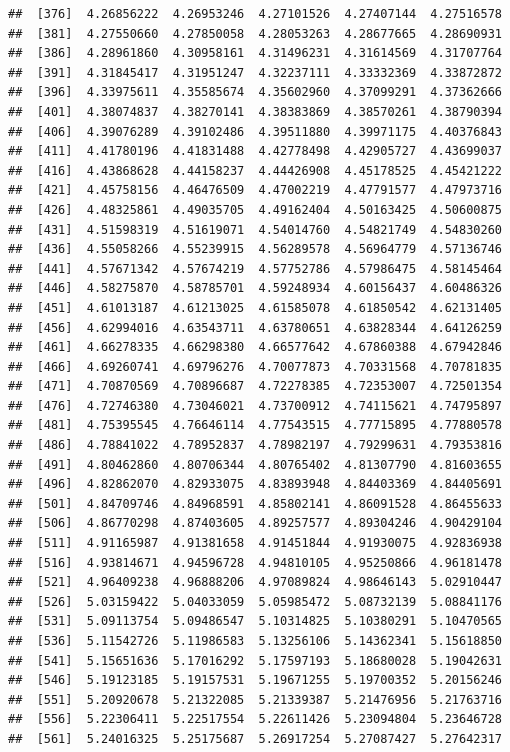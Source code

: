\documentclass[
  11pt]{report}
\begin{document}
\begin{itemize}
\begin{verbatim}
##  [376]  4.26856222  4.26953246  4.27101526  4.27407144  4.27516578
##  [381]  4.27550660  4.27850058  4.28053263  4.28677665  4.28690931
##  [386]  4.28961860  4.30958161  4.31496231  4.31614569  4.31707764
##  [391]  4.31845417  4.31951247  4.32237111  4.33332369  4.33872872
##  [396]  4.33975611  4.35585674  4.35602960  4.37099291  4.37362666
##  [401]  4.38074837  4.38270141  4.38383869  4.38570261  4.38790394
##  [406]  4.39076289  4.39102486  4.39511880  4.39971175  4.40376843
##  [411]  4.41780196  4.41831488  4.42778498  4.42905727  4.43699037
##  [416]  4.43868628  4.44158237  4.44426908  4.45178525  4.45421222
##  [421]  4.45758156  4.46476509  4.47002219  4.47791577  4.47973716
##  [426]  4.48325861  4.49035705  4.49162404  4.50163425  4.50600875
##  [431]  4.51598319  4.51619071  4.54014760  4.54821749  4.54830260
##  [436]  4.55058266  4.55239915  4.56289578  4.56964779  4.57136746
##  [441]  4.57671342  4.57674219  4.57752786  4.57986475  4.58145464
##  [446]  4.58275870  4.58785701  4.59248934  4.60156437  4.60486326
##  [451]  4.61013187  4.61213025  4.61585078  4.61850542  4.62131405
##  [456]  4.62994016  4.63543711  4.63780651  4.63828344  4.64126259
##  [461]  4.66278335  4.66298380  4.66577642  4.67860388  4.67942846
##  [466]  4.69260741  4.69796276  4.70077873  4.70331568  4.70781835
##  [471]  4.70870569  4.70896687  4.72278385  4.72353007  4.72501354
##  [476]  4.72746380  4.73046021  4.73700912  4.74115621  4.74795897
##  [481]  4.75395545  4.76646114  4.77543515  4.77715895  4.77880578
##  [486]  4.78841022  4.78952837  4.78982197  4.79299631  4.79353816
##  [491]  4.80462860  4.80706344  4.80765402  4.81307790  4.81603655
##  [496]  4.82862070  4.82933075  4.83893948  4.84403369  4.84405691
##  [501]  4.84709746  4.84968591  4.85802141  4.86091528  4.86455633
##  [506]  4.86770298  4.87403605  4.89257577  4.89304246  4.90429104
##  [511]  4.91165987  4.91381658  4.91451844  4.91930075  4.92836938
##  [516]  4.93814671  4.94596728  4.94810105  4.95250866  4.96181478
##  [521]  4.96409238  4.96888206  4.97089824  4.98646143  5.02910447
##  [526]  5.03159422  5.04033059  5.05985472  5.08732139  5.08841176
##  [531]  5.09113754  5.09486547  5.10314825  5.10380291  5.10470565
##  [536]  5.11542726  5.11986583  5.13256106  5.14362341  5.15618850
##  [541]  5.15651636  5.17016292  5.17597193  5.18680028  5.19042631
##  [546]  5.19123185  5.19157531  5.19671255  5.19700352  5.20156246
##  [551]  5.20920678  5.21322085  5.21339387  5.21476956  5.21763716
##  [556]  5.22306411  5.22517554  5.22611426  5.23094804  5.23646728
##  [561]  5.24016325  5.25175687  5.26917254  5.27087427  5.27642317

\end{verbatim}
\end{itemize}
\end{document}
